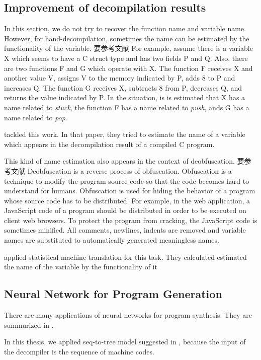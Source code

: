 \documentclass[senior,final,11pt]{iscs-thesis}
\begin{document}
\subsection{Improvement of decompilation results}
In this section, we do not try to recover the function name and variable name. 
However, for hand-decompilation, sometimes the name can be estimated by the functionality of the variable.
要参考文献
For example, assume there is a variable X which seems to have a C struct type and has two fields P and Q.
Also, there are two functions F and G which operate with X. 
The function F receives X and another value V, assigns V to the memory indicated by P, adds 8 to P and increases Q. 
The function G receives X, subtracts 8 from P, decreases Q, and returns the value indicated by P.
In the situation, is is estimated that X has a name related to {\sl stuck}, the function F has a name related to {\sl push},
ands G has a name related to {\sl pop}.

\cite{name_recover_from_decompile_result} tackled this work. 
In that paper, they tried to estimate the name of a variable which appears in the decompilation result of a compiled C program.

This kind of name estimation also appears in the context of deobfuscation.
要参考文献
Deobfuscation is a reverse process of obfuscation.
Obfuscation is a technique to modify the program source code so that the code becomes hard to understand for humans. 
Obfuscation is used for hiding the behavior of a program whose source code has to be distributed.
For example, in the web application, a JavaScript code of a program should be distributed in order to be executed on client web browsers.
To protect the program from cracking, the JavaScript code is sometimes minified. All comments, newlines, indents are removed and variable names are substituted to automatically generated meaningless names.

\cite{JSNaughty} applied statistical machine translation for this task. 
They calculated estimated the name of the variable by the functionality of it

\subsection{Neural Network for Program Generation}

There are many applications of neural networks for program synthesis. They are summurized in \cite{deep_programming_matome}.

In this thesis, we applied seq-to-tree model suggested in \cite{Seq2Tree}, because the input of the decompiler is the sequence of machine codes.
\end{document}
